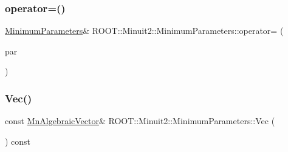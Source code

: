 \mbox{\label{classROOT_1_1Minuit2_1_1MinimumParameters_a60b35f7b9d6b7e49d2573581a3a9f081}} 
\subsubsection{\texorpdfstring{operator=()}{operator=()}\hspace{0.1cm}{\footnotesize\ttfamily [2/2]}}
{\footnotesize\ttfamily \mbox{\hyperlink{classROOT_1_1Minuit2_1_1MinimumParameters}{Minimum\+Parameters}}\& R\+O\+O\+T\+::\+Minuit2\+::\+Minimum\+Parameters\+::operator= (\begin{DoxyParamCaption}\item[{const \mbox{\hyperlink{classROOT_1_1Minuit2_1_1MinimumParameters}{Minimum\+Parameters}} \&}]{par }\end{DoxyParamCaption})\hspace{0.3cm}{\ttfamily [inline]}}

\mbox{\label{classROOT_1_1Minuit2_1_1MinimumParameters_ad93c17d14f4ddbc66c91107ff3a80dbe}} 
\subsubsection{\texorpdfstring{Vec()}{Vec()}\hspace{0.1cm}{\footnotesize\ttfamily [1/2]}}
{\footnotesize\ttfamily const \mbox{\hyperlink{namespaceROOT_1_1Minuit2_a62ed97730a1ca8d3fbaec64a19aa11c9}{Mn\+Algebraic\+Vector}}\& R\+O\+O\+T\+::\+Minuit2\+::\+Minimum\+Parameters\+::\+Vec (\begin{DoxyParamCaption}{ }\end{DoxyParamCaption}) const\hspace{0.3cm}{\ttfamily [inline]}}


